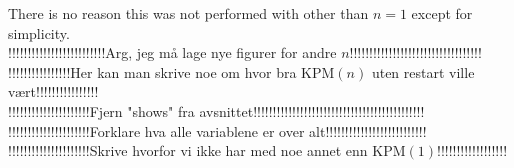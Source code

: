 There is no reason this was not performed with other than $n = 1$ except for simplicity.
\\!!!!!!!!!!!!!!!!!!!!!!!!!Arg, jeg må lage nye figurer for andre $n$!!!!!!!!!!!!!!!!!!!!!!!!!!!!!!!!!!
\\!!!!!!!!!!!!!!!!Her kan man skrive noe om hvor bra KPM$(n)$ uten restart ville vært!!!!!!!!!!!!!!!!\\
!!!!!!!!!!!!!!!!!!!!!Fjern "shows" fra avsnittet!!!!!!!!!!!!!!!!!!!!!!!!!!!!!!!!!!!!!!!!!!!!\\
!!!!!!!!!!!!!!!!!!!!!Forklare hva alle variablene er over alt!!!!!!!!!!!!!!!!!!!!!!!!!!\\
!!!!!!!!!!!!!!!!!!!!!Skrive hvorfor vi ikke har med noe annet enn KPM$(1)$!!!!!!!!!!!!!!!!!!\\
